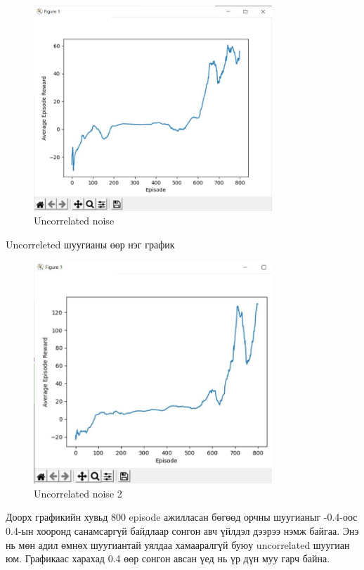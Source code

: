 \documentclass[12pt,A4]{report}
\begin{document}
\begin{figure}[H]
\centering
\includegraphics[width=0.8\textwidth]{./images/after_800_ep_02}
\caption{Uncorrelated noise}
\end{figure}

Uncorreleted шуугианы өөр нэг график

\begin{figure}[H]
\centering
\includegraphics[width=0.8\textwidth]{./images/after_800_ep_02_am}
\caption{Uncorrelated noise 2}
\end{figure}

Доорх графикийн хувьд 800 episode ажилласан бөгөөд орчны шуугианыг -0.4-оос 0.4-ын хооронд санамсаргүй байдлаар сонгон авч үйлдэл дээрээ нэмж байгаа. Энэ нь мөн адил өмнөх шуугиантай уялдаа хамааралгүй буюу uncorrelated шуугиан юм. Графикаас харахад 0.4 өөр сонгон авсан үед нь үр дүн муу гарч байна.
\end{document}
